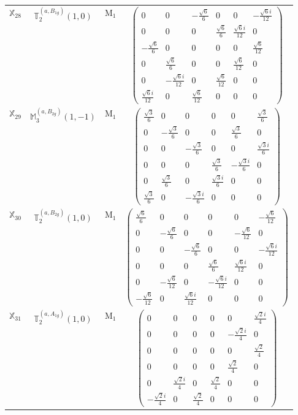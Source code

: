 \documentclass[fleqn,10pt,landscape]{article}
\begin{document}
\begin{itemize}
\begin{center}
\begin{longtable}{c|c|c|c}
$ \mathbb{X}_{28} $ & $\mathbb{T}_{2}^{(a,B_{1g})}(1,0)$ & M$_{1}$ & $\begin{pmatrix} 0 & 0 & - \frac{\sqrt{6}}{6} & 0 & 0 & - \frac{\sqrt{6} i}{12} \\ 0 & 0 & 0 & \frac{\sqrt{6}}{6} & \frac{\sqrt{6} i}{12} & 0 \\ - \frac{\sqrt{6}}{6} & 0 & 0 & 0 & 0 & \frac{\sqrt{6}}{12} \\ 0 & \frac{\sqrt{6}}{6} & 0 & 0 & \frac{\sqrt{6}}{12} & 0 \\ 0 & - \frac{\sqrt{6} i}{12} & 0 & \frac{\sqrt{6}}{12} & 0 & 0 \\ \frac{\sqrt{6} i}{12} & 0 & \frac{\sqrt{6}}{12} & 0 & 0 & 0 \end{pmatrix}$ \\
$ \mathbb{X}_{29} $ & $\mathbb{M}_{3}^{(a,B_{2g})}(1,-1)$ & M$_{1}$ & $\begin{pmatrix} \frac{\sqrt{3}}{6} & 0 & 0 & 0 & 0 & \frac{\sqrt{3}}{6} \\ 0 & - \frac{\sqrt{3}}{6} & 0 & 0 & \frac{\sqrt{3}}{6} & 0 \\ 0 & 0 & - \frac{\sqrt{3}}{6} & 0 & 0 & \frac{\sqrt{3} i}{6} \\ 0 & 0 & 0 & \frac{\sqrt{3}}{6} & - \frac{\sqrt{3} i}{6} & 0 \\ 0 & \frac{\sqrt{3}}{6} & 0 & \frac{\sqrt{3} i}{6} & 0 & 0 \\ \frac{\sqrt{3}}{6} & 0 & - \frac{\sqrt{3} i}{6} & 0 & 0 & 0 \end{pmatrix}$ \\
$ \mathbb{X}_{30} $ & $\mathbb{T}_{2}^{(a,B_{2g})}(1,0)$ & M$_{1}$ & $\begin{pmatrix} \frac{\sqrt{6}}{6} & 0 & 0 & 0 & 0 & - \frac{\sqrt{6}}{12} \\ 0 & - \frac{\sqrt{6}}{6} & 0 & 0 & - \frac{\sqrt{6}}{12} & 0 \\ 0 & 0 & - \frac{\sqrt{6}}{6} & 0 & 0 & - \frac{\sqrt{6} i}{12} \\ 0 & 0 & 0 & \frac{\sqrt{6}}{6} & \frac{\sqrt{6} i}{12} & 0 \\ 0 & - \frac{\sqrt{6}}{12} & 0 & - \frac{\sqrt{6} i}{12} & 0 & 0 \\ - \frac{\sqrt{6}}{12} & 0 & \frac{\sqrt{6} i}{12} & 0 & 0 & 0 \end{pmatrix}$ \\
$ \mathbb{X}_{31} $ & $\mathbb{T}_{2}^{(a,A_{1g})}(1,0)$ & M$_{1}$ & $\begin{pmatrix} 0 & 0 & 0 & 0 & 0 & \frac{\sqrt{2} i}{4} \\ 0 & 0 & 0 & 0 & - \frac{\sqrt{2} i}{4} & 0 \\ 0 & 0 & 0 & 0 & 0 & \frac{\sqrt{2}}{4} \\ 0 & 0 & 0 & 0 & \frac{\sqrt{2}}{4} & 0 \\ 0 & \frac{\sqrt{2} i}{4} & 0 & \frac{\sqrt{2}}{4} & 0 & 0 \\ - \frac{\sqrt{2} i}{4} & 0 & \frac{\sqrt{2}}{4} & 0 & 0 & 0 \end{pmatrix}$ \\

\end{longtable}
\end{center}
\end{itemize}
\end{document}
